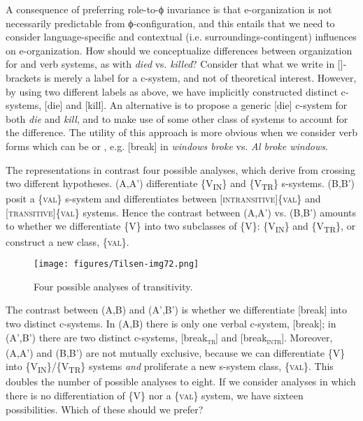   A consequence of preferring role-to-ϕ invariance is that e-organization is not necessarily predictable from ϕ-configuration, and this entails that we need to consider language-specific and contextual (i.e. surroundings-contingent) influences on e-organization. How should we conceptualize differences between organization for  and  verb systems, as with \textit{died} vs. \textit{killed}? Consider that what we write in []-brackets is merely a label for a c-system, and not of theoretical interest. However, by using two different labels as above, we have implicitly constructed distinct c-systems, [die] and [kill]. An alternative is to propose a generic [die] c-system for both \textit{die} and \textit{kill}, and to make use of some other class of systems to account for the  difference. The utility of this approach is more obvious when we consider verb forms which can be  or , e.g. [break] in \textit{windows broke} vs. \textit{Al broke windows}.\largerpage

  The representations in {} contrast four possible analyses, which derive from crossing two different hypotheses. (A,A') differentiate  \{V\textsubscript{IN}\} and  \{V\textsubscript{TR}\} s-systems. (B,B') posit a  \{\textsc{val}\} s-system and differentiates between [\textsc{intransitive}]\{\textsc{val}\} and [\textsc{transitive}]\{\textsc{val}\} systems. Hence the contrast between (A,A') vs. (B,B') amounts to whether we differentiate \{V\} into two subclasses of \{V\}: \{V\textsubscript{IN}\} and \{V\textsubscript{TR}\}, or construct a new class, \{\textsc{val}\}.

  
\begin{figure}
\texttt{[image: figures/Tilsen-img72.png]}
\caption{Four possible analyses of transitivity.}
\label{fig:4:22}
\end{figure}
 

  The contrast between (A,B) and (A',B') is whether we differentiate [break] into two distinct c-systems. In (A,B) there is only one verbal c-system, [break]; in (A',B') there are two distinct c-systems, [break\textsc{\textsubscript{tr}}] and [break\textsc{\textsubscript{intr}}]. Moreover, (A,A') and (B,B') are not mutually exclusive, because we can differentiate \{V\} into \{V\textsubscript{IN}\}/\{V\textsubscript{TR}\} systems \textit{and} proliferate a new s-system class, \{\textsc{val}\}. This doubles the number of possible analyses to eight. If we consider analyses in which there is no differentiation of \{V\} nor a \{\textsc{val}\} system, we have sixteen possibilities. Which of these should we prefer? 


